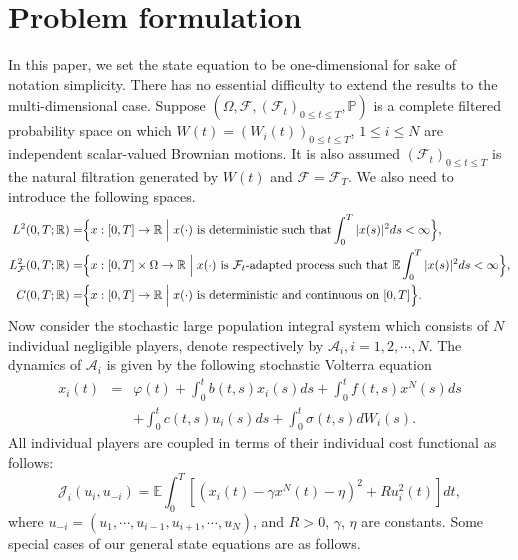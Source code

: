 \documentclass[11pt]{article}
\def\dbE{\mathbb{E}}
\def\dbR{\mathbb{R}}
\begin{document}
\section{Problem formulation}

In this paper, we set the state equation to be one-dimensional for sake of notation simplicity. There has no essential difficulty to extend the results to the multi-dimensional case. Suppose $(\Omega, \mathcal{F}, (\mathcal{F}_t)_{0\leq t\leq T},
\mathbb{P})$ is a complete filtered probability space on which
$W(t)=(W_i(t))_{0 \leq t \leq T}$, $1\leq i\leq N$ are independent scalar-valued Brownian motions. It is also assumed $(\mathcal
F_t)_{0\leq t\leq T}$ is the natural filtration generated by $W(t)$
and $\mathcal F=\mathcal F_T$. We also need to introduce the
following spaces.
\begin{eqnarray*}
\begin{split}
L^2(0,T;\dbR)=&\Big\{x:[0,T]\to
\dbR\Bigm|x(\cdot)\ \text{\rm is deterministic such that}\int_0^T|x(s)|^2ds<\infty\Big\},\\
%
L_\mathcal{F}^2(0,T;\dbR)=&\Big\{x:[0,T]\times\Omega\to \dbR\Bigm|
x(\cdot)\hbox{ is
$\mathcal{F}_t$-adapted process such that }
%
\dbE\int_0^T|x(s)|^2ds<\infty\Big\},\\
%
C(0,T;\dbR)=&\Big\{x:[0,T]\to \dbR\Bigm| x(\cdot)\hbox{ is
deterministic and continuous on $[0,T]$} \Big\}.
\end{split}
\end{eqnarray*}
Now consider the stochastic large population integral system which consists of $N$ individual negligible players, denote respectively
by $\mathcal{A}_i, i=1, 2, \cdots, N$. The dynamics of
$\mathcal{A}_i$ is given by the following stochastic Volterra
equation
\begin{eqnarray}\label{2.1}
x_{i}(t) & = & \varphi(t)+\int_{0}^{t}b(t,s)x_{i}(s)ds+\int_{0}^{t}f(t,s)x^{N}(s)ds\nonumber\\
& & +\int_{0}^{t}c(t,s)u_{i}(s)ds+%
\int_{0}^{t}\sigma(t,s)dW_{i}(s).
\end{eqnarray}%
 All
individual players are coupled in terms of their individual cost functional
as follows:
\begin{equation}\label{2.2}
\mathcal{J}_{i}(u_{i},u_{-i})=\dbE\int_{0}^{T}\left[
(x_{i}(t)-\gamma x^{N}(t)-\eta )^{2}+Ru_{i}^{2}(t)\right] dt,
\end{equation}%
where $u_{-i}=(u_1,\cdots,u_{i-1},u_{i+1},\cdots,u_{N})$, and $R>0$,
$\gamma$, $\eta$ are constants. Some special cases of our general state equations are as
follows.
\end{document}
